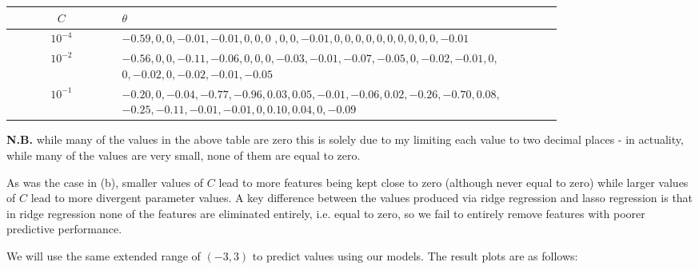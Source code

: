 \documentclass[12pt]{article}
\begin{document}
\begin{center}
    \begin{tabular}{|c|p{0.8\linewidth}|}
        \hline
        $C$ & $\theta$ \\
        \hline
        $10^{-4}$ & $-0.59, 0, 0, -0.01, -0.01, 0, 0, 0$ $, 0, 0, -0.01, 0, 0, 0, 0, 0, 0, 0, 0, 0, 0, -0.01$ \\
        \hline
        $10^{-2}$ & $-0.56, 0, 0, -0.11, -0.06, 0, 0, 0, -0.03, -0.01, -0.07, -0.05, 0, -0.02, -0.01, 0,$ $0, -0.02, 0, -0.02, -0.01, -0.05$ \\
        \hline
        $10^{-1}$ & $-0.20, 0, -0.04, -0.77, -0.96, 0.03, 0.05, -0.01, -0.06, 0.02, -0.26, -0.70, 0.08,$ $-0.25, -0.11, -0.01, -0.01, 0, 0.10, 0.04, 0, -0.09$ \\
        \hline
    \end{tabular}
\end{center}

\textbf{N.B.} while many of the values in the above table are zero this is solely due to my limiting each value to two decimal places - in actuality, while many of the values are very small, none of them are equal to zero.

As was the case in (b), smaller values of $C$ lead to more features being kept close to zero (although never equal to zero) while larger values of $C$ lead to more divergent parameter values. A key difference between the values produced via ridge regression and lasso regression is that in ridge regression none of the features are eliminated entirely, i.e. equal to zero, so we fail to entirely remove features with poorer predictive performance.

We will use the same extended range of $(-3, 3)$ to predict values using our models. The result plots are as follows:
\end{document}
